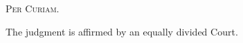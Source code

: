 
\setcounter{page}{2}

  \textsc{Per Curiam.}

  The judgment is affirmed by an equally divided Court.
